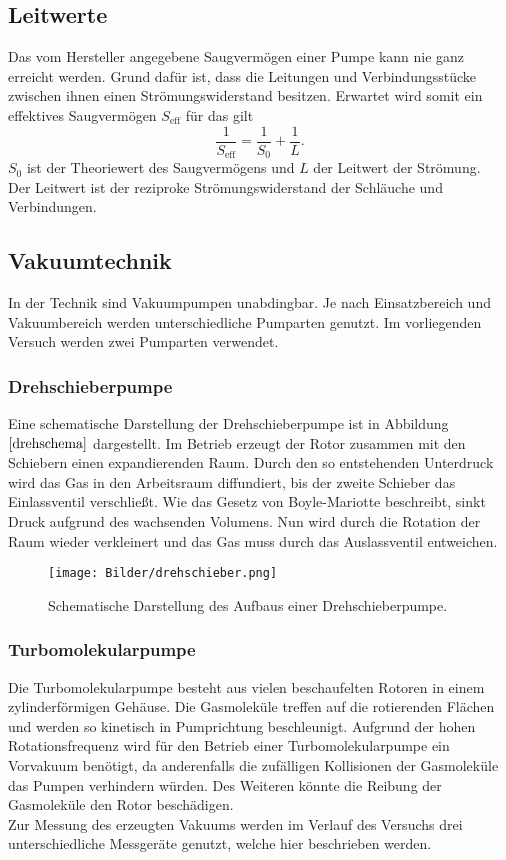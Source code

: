 \subsection{Leitwerte}
Das vom Hersteller angegebene Saugvermögen einer Pumpe kann nie ganz erreicht werden.
Grund dafür ist, dass die Leitungen und Verbindungsstücke zwischen ihnen einen Strömungswiderstand besitzen.
Erwartet wird somit ein effektives Saugvermögen $S_\text{eff}$ für das gilt
\begin{equation}
  \frac{1}{S_\text{eff}}=\frac{1}{S_0}+\frac{1}{L}.
\end{equation}
$S_0$ ist der Theoriewert des Saugvermögens und $L$ der Leitwert der Strömung.\\
Der Leitwert ist der reziproke Strömungswiderstand der Schläuche und Verbindungen.
\subsection{Vakuumtechnik}
In der Technik sind Vakuumpumpen unabdingbar.
Je nach Einsatzbereich und Vakuumbereich werden unterschiedliche Pumparten genutzt.
Im vorliegenden Versuch werden zwei Pumparten verwendet.\\
\subsubsection{Drehschieberpumpe}
Eine schematische Darstellung der Drehschieberpumpe ist in Abbildung $\ref{drehschema}$ dargestellt. Im Betrieb erzeugt der Rotor zusammen mit den Schiebern einen expandierenden Raum. Durch den so entstehenden Unterdruck wird
das Gas in den Arbeitsraum diffundiert, bis der zweite Schieber das Einlassventil verschließt. Wie das Gesetz von Boyle-Mariotte beschreibt, sinkt Druck aufgrund des wachsenden Volumens.
Nun wird durch die Rotation der Raum wieder verkleinert und das Gas muss durch das Auslassventil entweichen.
\begin{figure}[H]
  \centering
  \texttt{[image: Bilder/drehschieber.png]}
  \caption{Schematische Darstellung des Aufbaus einer Drehschieberpumpe.\cite{schemadreh}}
  \label{drehschema}
\end{figure}

\subsubsection{Turbomolekularpumpe}
Die Turbomolekularpumpe besteht aus vielen beschaufelten Rotoren in einem zylinderförmigen Gehäuse. Die Gasmoleküle treffen auf die rotierenden Flächen und werden so kinetisch in Pumprichtung beschleunigt.
Aufgrund der hohen Rotationsfrequenz wird für den Betrieb einer Turbomolekularpumpe ein Vorvakuum benötigt, da anderenfalls die zufälligen Kollisionen der Gasmoleküle das Pumpen verhindern würden. Des Weiteren
könnte die Reibung der Gasmoleküle den Rotor beschädigen.
\\Zur Messung des erzeugten Vakuums werden im Verlauf des Versuchs drei unterschiedliche Messgeräte genutzt, welche hier beschrieben werden.
